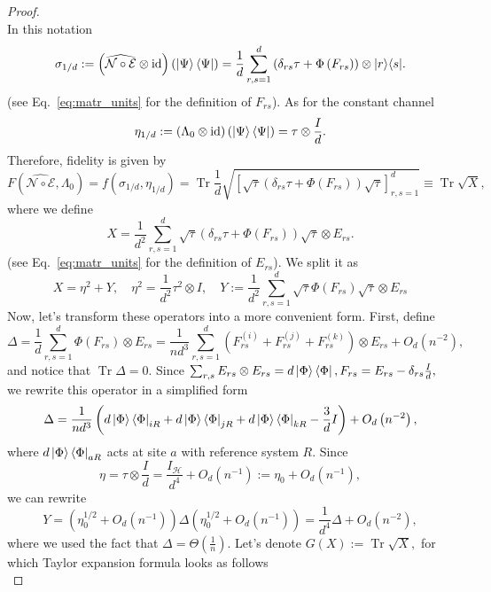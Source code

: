 \documentclass[10pt,twocolumn,superscriptaddress,aps,amsmath,amssymb,citeautoscript,floatfix,prx]{revtex4-2}
\theoremstyle{plain}
\theoremstyle{plain}
\theoremstyle{plain}
\theoremstyle{plain}
\theoremstyle{plain}
\theoremstyle{plain}
\theoremstyle{plain}
\theoremstyle{definition}
\theoremstyle{plain}
\begin{document}
\begin{appendix}
\begin{proof}
\[    \]
    In this notation 
    \[
        \sigma_{1/d}:=\left(\widehat{\mathcal{N} \circ \mathcal{E}} \otimes \operatorname{id}\right)\left(\ket{\Psi}\bra{\Psi}\right)=\frac{1}{d}\sum_{r,s=1}^d \left(\delta_{r s} \tau+\Phi\left(F_{r s}\right)\right) \otimes|r\rangle\langle s| .
    \]
    (see Eq.~\eqref{eq:matr_units} for the definition of $F_{r s}$). As for the constant channel
    \[
        \eta_{1/d}:=\left(\Lambda_0 \otimes \mathrm{id}\right)\left(\ket{\Psi}\bra{\Psi}\right)=\tau \otimes \frac{I}{d}.
    \]
    Therefore, fidelity is given by
    \[
        F(\widehat{\mathcal{N} \circ \mathcal{E}}, \Lambda_0)=f(\sigma_{1/d}, \eta_{1/d})=\operatorname{Tr} \frac{1}{d}\sqrt{\left[\sqrt{\tau}\left(\delta_{r s} \tau+\Phi\left(F_{r s}\right)\right) \sqrt{\tau} \right]_{r, s=1}^d}\equiv \operatorname{Tr} \sqrt{X},
    \] 
    where we define
    \[
        X=\frac{1}{d^2} \sum_{r, s=1}^d \sqrt{\tau}\left(\delta_{r s} \tau+\Phi\left(F_{r s}\right)\right) \sqrt{\tau} \otimes E_{r s}.
    \]
    (see Eq.~\eqref{eq:matr_units} for the definition of $E_{r s}$). We split it as
    \[
        X=\eta^2+Y, \quad \eta^2=\frac{1}{d^2} \tau^2 \otimes I, \quad Y:=\frac{1}{d^2} \sum_{r, s=1}^d \sqrt{\tau} \Phi\left(F_{r s}\right) \sqrt{\tau} \otimes E_{r s}
    \]
    Now, let's transform these operators into a more convenient form. First, define
    \[
        \Delta=\frac{1}{d} \sum_{r, s=1}^d \Phi\left(F_{r s}\right) \otimes E_{r s}=\frac{1}{n d^3} \sum_{r, s=1}^d\left(F_{r s}^{(i)}+F_{r s}^{(j)}+F_{r s}^{(k)}\right) \otimes E_{r s}+O_{d}\left(n^{-2}\right),
    \]
    and notice that $\operatorname{Tr} \Delta=0$. Since
    $
        \sum_{r, s} E_{r s} \otimes E_{r s}=d\ket{\Phi}\bra{\Phi}, F_{r s}=E_{r s}-\delta_{r s} \frac{I}{d},
    $
    we rewrite this operator in a simplified form
    \[
        \Delta=\frac{1}{n d^3}\left(d\ket{\Phi}\bra{\Phi}_{i R}+d\ket{\Phi}\bra{\Phi}_{j R}+d\ket{\Phi}\bra{\Phi}_{k R}-\frac{3}{d} I\right)+O_{d}\left(n^{-2}\right),
    \]
    where $d\ket{\Phi}\bra{\Phi}_{a R}$ acts at site $a$ with reference system $R$. 
    Since
    \[
        \eta=\tau \otimes \frac{I}{d}=\frac{I_{\mathcal{H}}}{d^4}+O_{d}\left(n^{-1}\right):=\eta_0+O_{d}\left(n^{-1}\right),
    \]
    we can rewrite
    \[
        Y=(\eta_0^{1 / 2}+O_{d}\left(n^{-1}\right))\Delta(\eta_0^{1 / 2}+O_{d}\left(n^{-1}\right))=\frac{1}{d^4} \Delta+O_{d}\left(n^{-2}\right),
    \]
    where we used the fact that $\Delta=\Theta(\frac{1}{n})$.
    Let's denote
    $
        G(X):=\operatorname{Tr} \sqrt{X},
    $
    for which Taylor expansion formula looks as follows
    \[
\]
\end{proof}
\end{appendix}
\end{document}
